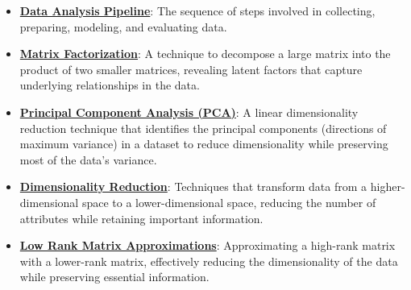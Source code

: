 \documentclass{article}%
\begin{document}
\begin{itemize}[leftmargin=*]
\item \href{https://purdue.brightspace.com/d2l/common/assets/pdfjs-d2l-dist/1.0.14-legacy/web/viewer.html?file=%2Fcontent%2Fenforced%2F1095467-wl.202510.CS.24300.001%2F10L1-CrossValidation.pdf%3Fou%3D1095467&lang=en-us&container=d2l-fileviewer-rendered-pdf&fullscreen=d2l-fileviewer-rendered-pdf-dialog&height=667#page=26}{\textbf{Data Analysis Pipeline}}: The sequence of steps involved in collecting, preparing, modeling, and evaluating data.%
\end{itemize}%
\begin{itemize}[leftmargin=*]%
\item \href{https://purdue.brightspace.com/d2l/common/assets/pdfjs-d2l-dist/1.0.14-legacy/web/viewer.html?file=%2Fcontent%2Fenforced%2F1095467-wl.202510.CS.24300.001%2F11L2-svd-pca-recommender.pdf%3Fou%3D1095467&lang=en-us&container=d2l-fileviewer-rendered-pdf&fullscreen=d2l-fileviewer-rendered-pdf-dialog&height=667#page=2}{\textbf{Matrix Factorization}}: A technique to decompose a large matrix into the product of two smaller matrices, revealing latent factors that capture underlying relationships in the data.%
\item \href{https://purdue.brightspace.com/d2l/common/assets/pdfjs-d2l-dist/1.0.14-legacy/web/viewer.html?file=%2Fcontent%2Fenforced%2F1095467-wl.202510.CS.24300.001%2F11L2-svd-pca-recommender.pdf%3Fou%3D1095467&lang=en-us&container=d2l-fileviewer-rendered-pdf&fullscreen=d2l-fileviewer-rendered-pdf-dialog&height=667#page=15}{\textbf{Principal Component Analysis (PCA)}}: A linear dimensionality reduction technique that identifies the principal components (directions of maximum variance) in a dataset to reduce dimensionality while preserving most of the data's variance.%
\item \href{https://purdue.brightspace.com/d2l/common/assets/pdfjs-d2l-dist/1.0.14-legacy/web/viewer.html?file=%2Fcontent%2Fenforced%2F1095467-wl.202510.CS.24300.001%2F11L2-svd-pca-recommender.pdf%3Fou%3D1095467&lang=en-us&container=d2l-fileviewer-rendered-pdf&fullscreen=d2l-fileviewer-rendered-pdf-dialog&height=667#page=8}{\textbf{Dimensionality Reduction}}: Techniques that transform data from a higher-dimensional space to a lower-dimensional space, reducing the number of attributes while retaining important information.%
\item \href{https://purdue.brightspace.com/d2l/common/assets/pdfjs-d2l-dist/1.0.14-legacy/web/viewer.html?file=%2Fcontent%2Fenforced%2F1095467-wl.202510.CS.24300.001%2F11L2-svd-pca-recommender.pdf%3Fou%3D1095467&lang=en-us&container=d2l-fileviewer-rendered-pdf&fullscreen=d2l-fileviewer-rendered-pdf-dialog&height=667#page=9}{\textbf{Low Rank Matrix Approximations}}: Approximating a high-rank matrix with a lower-rank matrix, effectively reducing the dimensionality of the data while preserving essential information.%

\end{itemize}
\end{document}

